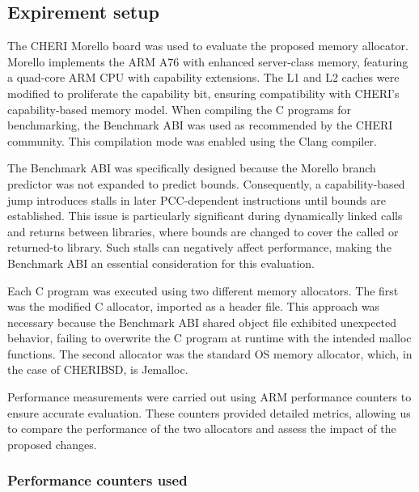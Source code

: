 \documentclass[11pt]{article}
\begin{document}
\subsection{Expirement setup}
\label{sec:org9bf5b27}

The CHERI Morello board was used to evaluate the proposed memory allocator. 
Morello implements the ARM A76 with enhanced server-class memory, featuring a 
quad-core ARM CPU with capability extensions. The L1 and L2 caches were modified 
to proliferate the capability bit, ensuring compatibility with CHERI's capability-based 
memory model. When compiling the C programs for benchmarking, the Benchmark ABI was 
used as recommended by the CHERI community. This compilation mode was enabled using 
the Clang compiler.

The Benchmark ABI was specifically designed because the Morello branch predictor 
was not expanded to predict bounds. Consequently, a capability-based jump introduces 
stalls in later PCC-dependent instructions until bounds are established. This issue 
is particularly significant during dynamically linked calls and returns between 
libraries, where bounds are changed to cover the called or returned-to library. 
Such stalls can negatively affect performance, making the Benchmark ABI an essential 
consideration for this evaluation.

Each C program was executed using two different memory allocators. The first was 
the modified C allocator, imported as a header file. This approach was necessary 
because the Benchmark ABI shared object file exhibited unexpected behavior, 
failing to overwrite the C program at runtime with the intended malloc functions. 
The second allocator was the standard OS memory allocator, which, in the case of
CHERIBSD, is Jemalloc.

Performance measurements were carried out using ARM performance counters to 
ensure accurate evaluation. These counters provided detailed metrics, allowing 
us to compare the performance of the two allocators and assess the impact of 
the proposed changes.

\subsubsection{Performance counters used}
\label{sec:org294979c}
\end{document}
